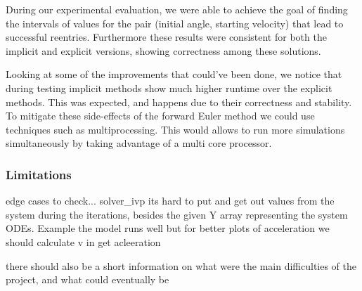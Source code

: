 \documentclass[runningheads]{llncs}
\begin{document}
During our experimental evaluation, we were able to achieve the goal of finding the intervals of values for the pair (initial angle, starting velocity) that lead to successful reentries. Furthermore these results were consistent for both the implicit and explicit versions, showing correctness among these solutions.

Looking at some of the improvements that could've been done, we notice that during testing implicit methods show much higher runtime over the explicit methods. This was expected, and happens due to their correctness and stability. To mitigate these side-effects of the forward Euler method we could use techniques such as multiprocessing. This would allows to run more simulations simultaneously by taking advantage of a multi core processor.

\subsubsection*{Limitations}
edge cases to check... 
solver\_ivp its hard to put and get out values from the system during the iterations, besides the given Y array representing the system ODEs. Example the model runs well but for better plots of acceleration we should calculate v in get acleeration 

 there should also be a short information on what were the main difficulties of the project, and what could eventually be



\end{document}

